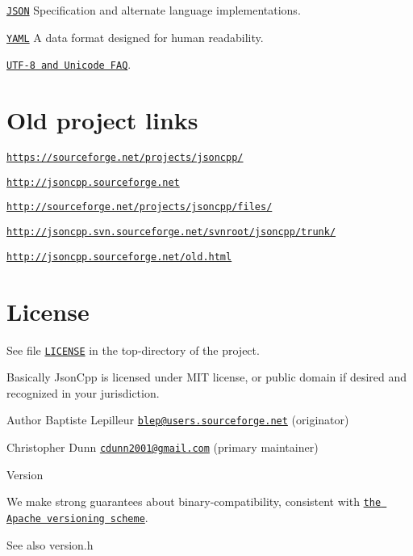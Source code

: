 \begin{DoxyItemize}
\item \href{http://www.json.org/}{\tt J\+S\+ON} Specification and alternate language implementations.
\item \href{http://www.yaml.org/}{\tt Y\+A\+ML} A data format designed for human readability.
\item \href{http://www.cl.cam.ac.uk/~mgk25/unicode.html}{\tt U\+T\+F-\/8 and Unicode F\+AQ}.
\end{DoxyItemize}\hypertarget{index__plinks}{}\section{Old project links}\label{index__plinks}

\begin{DoxyItemize}
\item \href{https://sourceforge.net/projects/jsoncpp/}{\tt https\+://sourceforge.\+net/projects/jsoncpp/}
\item \href{http://jsoncpp.sourceforge.net}{\tt http\+://jsoncpp.\+sourceforge.\+net}
\item \href{http://sourceforge.net/projects/jsoncpp/files/}{\tt http\+://sourceforge.\+net/projects/jsoncpp/files/}
\item \href{http://jsoncpp.svn.sourceforge.net/svnroot/jsoncpp/trunk/}{\tt http\+://jsoncpp.\+svn.\+sourceforge.\+net/svnroot/jsoncpp/trunk/}
\item \href{http://jsoncpp.sourceforge.net/old.html}{\tt http\+://jsoncpp.\+sourceforge.\+net/old.\+html}
\end{DoxyItemize}\hypertarget{index__license}{}\section{License}\label{index__license}
See file \href{https://github.com/open-source-parsers/jsoncpp/blob/master/LICENSE}{\tt {\ttfamily L\+I\+C\+E\+N\+SE}} in the top-\/directory of the project.

Basically Json\+Cpp is licensed under M\+IT license, or public domain if desired and recognized in your jurisdiction.

\begin{DoxyAuthor}{Author}
Baptiste Lepilleur \href{mailto:blep@users.sourceforge.net}{\tt blep@users.\+sourceforge.\+net} (originator) 

Christopher Dunn \href{mailto:cdunn2001@gmail.com}{\tt cdunn2001@gmail.\+com} (primary maintainer) 
\end{DoxyAuthor}
\begin{DoxyVersion}{Version}

\begin{DoxyCodeInclude}
\end{DoxyCodeInclude}
 We make strong guarantees about binary-\/compatibility, consistent with \href{http://apr.apache.org/versioning.html}{\tt the Apache versioning scheme}. 
\end{DoxyVersion}
\begin{DoxySeeAlso}{See also}
version.\+h 
\end{DoxySeeAlso}
